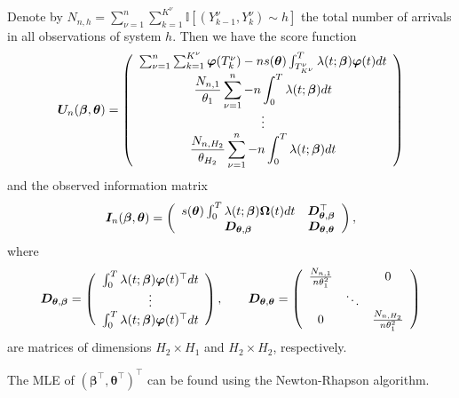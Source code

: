 {\begin{example}
	Denote by $N_{n,h} = \sum_{\nu=1}^n \sum_{k=1}^{K^{\nu}} \mathbb{I} [(Y_{k-1}^{\nu}, Y_{k}^{\nu}) \sim h]$ the total number of arrivals in all observations of system $h$. Then we have the score function	
	\[
		\bm{U}_n (\bm{\beta}, \bm{\theta}) = 
			\left(
			\begin{array}{c}
				\sum_{\nu=1}^n \sum_{k=1}^{K^{\nu}} \bm{\varphi} (T_k^{\nu})
				- n s(\bm{\theta}) \int_{T_{K^{\nu}}^{\nu}}^{T} \lambda(t; \bm{\beta}) \bm{\varphi} (t) dt
				\\
				\displaystyle{\frac{N_{n,1}}{\theta_1}} \sum_{\nu=1}^n -
				n \int_{0}^{T} \lambda(t; \bm{\beta}) dt
				\\
				\vdots
				\\
				\displaystyle{\frac{N_{n,H_2}}{\theta_{H_2}}} \sum_{\nu=1}^n -
				n \int_{0}^{T} \lambda(t; \bm{\beta}) dt
			\end{array}
			\right)
	\]
and the observed information matrix
	\[
		\bm{I}_n (\bm{\beta}, \bm{\theta}) = 
			\left(
			\begin{array}{cc}
				s(\bm{\theta}) \int_{0}^{T} \lambda(t; \bm{\beta}) \bm{\Omega} (t) dt & \bm{D}_{\bm{\theta}, \bm{\beta}}^{\top} \\
				\bm{D}_{\bm{\theta}, \bm{\beta}}						                    & \bm{D}_{\bm{\theta}, \bm{\theta}}
			\end{array}
			\right),
	\]
	where
	\[
		\bm{D}_{\bm{\theta}, \bm{\beta}} = 
			\left(
			\begin{array}{c}
				\int_{0}^{T} \lambda(t; \bm{\beta}) \bm{\varphi} (t)^{\top} dt \\
				\vdots \\
				\int_{0}^{T} \lambda(t; \bm{\beta}) \bm{\varphi} (t)^{\top} dt
			\end{array}
			\right),
		\qquad
		\bm{D}_{\bm{\theta}, \bm{\theta}} = 
			\left(
			\begin{array}{ccc}
				\frac{N_{n,1}}{n \theta_1^2} & & 0 \\
				& \ddots & \\
				0 & & \frac{N_{n,H_2}}{n \theta_1^2}
			\end{array}
			\right)
	\]
	are matrices of dimensions $H_2 \times H_1$ and $H_2 \times H_2$, respectively.
	
	The MLE of $(\bm{\beta}^{\top}, \bm{\theta}^{\top})^{\top}$ can be found using the Newton-Rhapson algorithm.



	\demo
\end{example}



}
